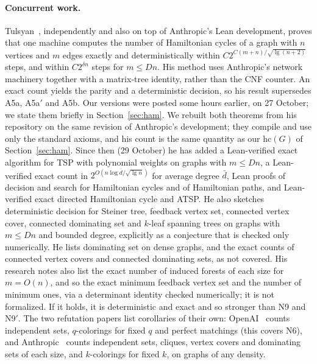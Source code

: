 \documentclass[11pt]{article}
\theoremstyle{remark}
\begin{document}
\paragraph{Concurrent work.} Tulsyan~\cite{Tul26}, independently and also on top of Anthropic's
Lean development, proves that one machine computes the number of Hamiltonian cycles of a graph with
$n$ vertices and $m$ edges exactly and deterministically within $C2^{C(m+n)/\sqrt{\lg(n+2)}}$ steps,
and within $C2^{\delta n}$ steps for $m\le Dn$. His method uses Anthropic's network machinery
together with a matrix-tree identity, rather than the CNF counter. An exact count yields the parity
and a deterministic decision, so his result supersedes A5a, A5a$'$ and A5b. Our versions were
posted some hours earlier, on 27 October; we state them briefly in Section~\ref{sec:ham}. We rebuilt both theorems from his
repository on the same revision of Anthropic's development; they compile and use only the standard
axioms, and his count is the same quantity as our $\mathrm{hc}(G)$ of Section~\ref{sec:ham}. Since
then (29 October) he has added a Lean-verified exact algorithm for TSP with polynomial weights on
graphs with $m\le Dn$, a Lean-verified exact count in $2^{O(n\log\bar d/\sqrt{\lg n})}$ for average
degree $\bar d$, Lean proofs of decision and search for Hamiltonian cycles and of Hamiltonian paths,
and Lean-verified exact directed Hamiltonian cycle and ATSP. He also sketches deterministic
decision for Steiner tree, feedback vertex set, connected vertex cover, connected dominating set
and $k$-leaf spanning trees on graphs with $m\le Dn$ and bounded degree, explicitly as a conjecture that is checked only
numerically. He lists dominating set on dense graphs, and the exact counts of connected vertex
covers and connected dominating sets, as not covered. His research notes also list the exact number
of induced forests of each size for $m=O(n)$, and so the exact minimum feedback vertex set and the
number of minimum ones, via a determinant identity checked numerically; it is not formalized. If it
holds, it is deterministic and exact and so stronger than N9 and N9$'$. The two refutation papers list
corollaries of their own: OpenAI~\cite[Cor.~1.3]{openai} counts independent sets, $q$-colorings for
fixed $q$ and perfect matchings (this covers N6), and Anthropic~\cite[Cor.~7]{anthropic} counts
independent sets, cliques, vertex covers and dominating sets of each size, and $k$-colorings for
fixed $k$, on graphs of any density.
\end{document}
